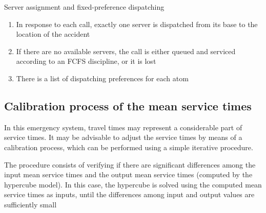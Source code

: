 \begin{frame}{Server assignment and fixed-preference dispatching}
  \begin{enumerate}
  \item In response to each call, 
    exactly one server is dispatched from its base to the location of the accident
  \item If there are no available servers, 
    the call is either queued and serviced according to an FCFS discipline,
    or it is lost
  \item There is a list of dispatching preferences for each atom
  \end{enumerate}
\end{frame}

\subsection{Calibration process of the mean service times}
\begin{frame}
In this emergency system, 
travel times may represent a considerable part of service times. 
It may be advisable to adjust the service times by means of a calibration process,
which can be performed using a simple iterative procedure.

The procedure consists of 
verifying if there are significant differences among 
the input mean service times and the output mean service times (computed by the hypercube model). 
In this case, 
the hypercube is solved using the computed mean service times as inputs, 
until the differences among input and output values are sufficiently small
\end{frame}
